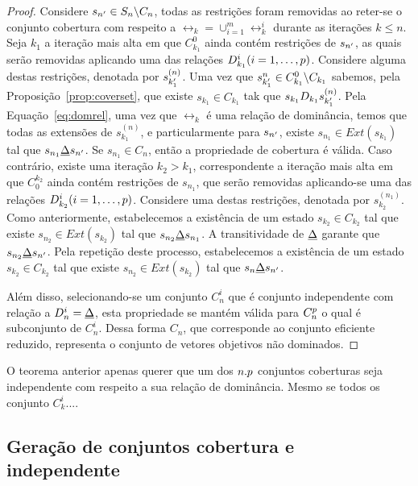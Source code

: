 \begin{proof}
  Considere $s_{{n'}} \in S_n\backslash C_n$, todas as restrições
  foram removidas ao reter-se o conjunto cobertura com respeito a
  $\rel_k = \cup_{i=1}^m \rel_k^i$ durante as iterações $k \leq n$.
  Seja $k_1$ a iteração mais alta em que $C_{k_1}^0$ ainda
  contém restrições de $s_{{n'}}$, as quais serão removidas
  aplicando uma das relações $D_{k_1}^i (i = 1, \ldots, p)$.
  Considere alguma destas restrições, denotada por $s_{{k_1'}}^{(n)}$.
  Uma vez que $s_{{k_1'}}^{n} \in C^0_{k_1}\backslash C_{k_1}$ sabemos,
  pela Proposição~\ref{prop:coverset}, que existe $s_{k_1} \in C_{k_1}$
  tak que $s_{k_1} D_{k_1} s_{{k_1'}}^{(n)}$.
  Pela Equação~\ref{eq:domrel}, uma vez que $\rel_{k}$ é uma relação de
  dominância, temos que todas as extensões de $s_{k_1}^{(n)}$, e
  particularmente para $s_{{n'}}$, existe $s_{n_1} \in Ext(s_{k_1})$
  tal que $s_{n_1} \underline{\Delta} s_{{n'}}$.
  Se $s_{n_1} \in C_n$, então a propriedade de cobertura é válida.
  Caso contrário, existe uma iteração $k_2 > k_1$, correspondente
  a iteração mais alta em que $C_0^{k_2}$ ainda contém restrições de $s_{n_1}$,
  que serão removidas aplicando-se uma das relações $D_{k_2}^i (i = 1, \ldots, p)$.
  Considere uma destas restrições, denotada por $s_{k_2}^{(n_1)}$.
  Como anteriormente, estabelecemos a existência de um estado $s_{k_2} \in C_{k_2}$
  tal que existe $s_{n_2} \in Ext(s_{k_2})$ tal que $s_{n_2} \underline{\Delta} s_{n_1}$.
  A transitividade de $\underline{\Delta}$ garante que $s_{n_2} \underline{\Delta} s_{{n'}}$.
  Pela repetição deste processo, estabelecemos a existência de um estado
  $s_{k_2} \in C_{k_2}$ tal que existe $s_{n_2} \in Ext(s_{k_2})$
  tal que $s_n \underline{\Delta} s_{{n'}}$.

  Além disso, selecionando-se um conjunto $C_n^i$ que é conjunto independente
  com relação a $D_n^i = \underline{\Delta}$, esta propriedade se mantém válida para $C_n^p$
  o qual é subconjunto de $C_n^i$.
  Dessa forma $C_n$, que corresponde ao conjunto eficiente reduzido,
  representa o conjunto de vetores objetivos não dominados.
  \qedhere
\end{proof}

O teorema anterior apenas querer que um dos $n . p$ conjuntos coberturas
seja independente com respeito a sua relação de dominância.
Mesmo se todos os conjunto $C_k^i$....


\subsection{Geração de conjuntos cobertura e independente}

